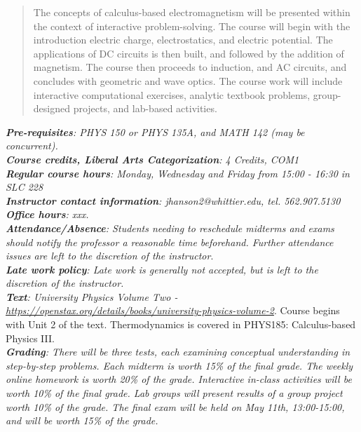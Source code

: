 \documentclass[10pt]{article}
\begin{document}
\maketitle

\begin{abstract}
The concepts of calculus-based electromagnetism will be presented within the context of interactive problem-solving.  The course will begin with the introduction electric charge, electrostatics, and electric potential.  The applications of DC circuits is then built, and followed by the addition of magnetism.  The course then proceeds to induction, and AC circuits, and concludes with geometric and wave optics.  The course work will include interactive computational exercises, analytic textbook problems, group-designed projects, and lab-based activities.
\end{abstract}
\noindent
\textit{\textbf{Pre-requisites}: PHYS 150 or PHYS 135A, and MATH 142 (may be concurrent).} \\
\textit{\textbf{Course credits, Liberal Arts Categorization}: 4 Credits, COM1} \\
\textit{\textbf{Regular course hours}: Monday, Wednesday and Friday from 15:00 - 16:30 in SLC 228} \\
\textit{\textbf{Instructor contact information}: jhanson2@whittier.edu, tel. 562.907.5130} \\
\textit{\textbf{Office hours}: xxx.} \\
\textit{\textbf{Attendance/Absence}: Students needing to reschedule midterms and exams should notify the professor a reasonable time beforehand. Further attendance issues are left to the discretion of the instructor}.\\ 
\textit{\textbf{Late work policy}: Late work is generally not accepted, but is left to the discretion of the instructor.} \\
\textit{\textbf{Text}: University Physics Volume Two - \url{https://openstax.org/details/books/university-physics-volume-2}}.  Course begins with Unit 2 of the text.  Thermodynamics is covered in PHYS185: Calculus-based Physics III. \\
\textit{\textbf{Grading}: There will be three tests, each examining conceptual understanding in step-by-step problems. Each
midterm is worth 15\% of the final grade. The weekly online homework is worth 20\% of the grade. Interactive
in-class activities will be worth 10\% of the final grade. Lab groups will present results of a group project worth 10\% of the grade.  The final exam will be held on May 11th, 13:00-15:00, and will be worth 15\% of the grade.} \\
\end{document}

